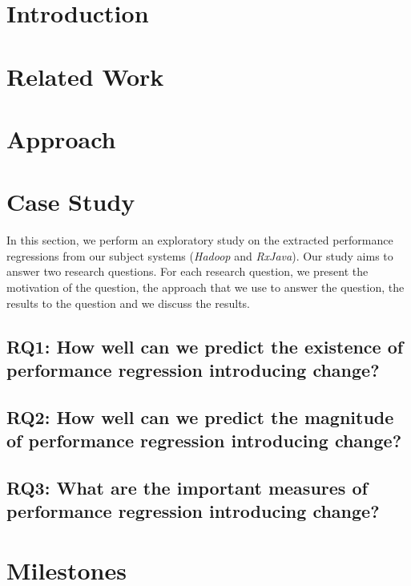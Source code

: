 \documentclass[conference]{IEEEtran}
\begin{document}
%
\IEEEpeerreviewmaketitle

\section{Introduction}
\label{sec:intro}


\section{Related Work}
\label{sec:related}


\section{Approach}
\label{sec:case}


\section{Case Study}
\label{sec:results}

In this section, we perform an exploratory study on the extracted performance regressions from our subject systems (\emph{Hadoop} and \emph{RxJava}). Our study aims to answer two research questions. For each research question, we present the motivation of the question, the approach that we use to answer the question, the results to the question and we discuss the results.

\subsection*{RQ1: How well can we predict the existence of performance regression introducing change?}


\subsection*{RQ2: How well can we predict the magnitude of performance regression introducing change?}


\subsection*{RQ3: What are the important measures of performance regression introducing change?}


%

\section{Milestones}
\label{sec:milestones}




 


\end{document}
